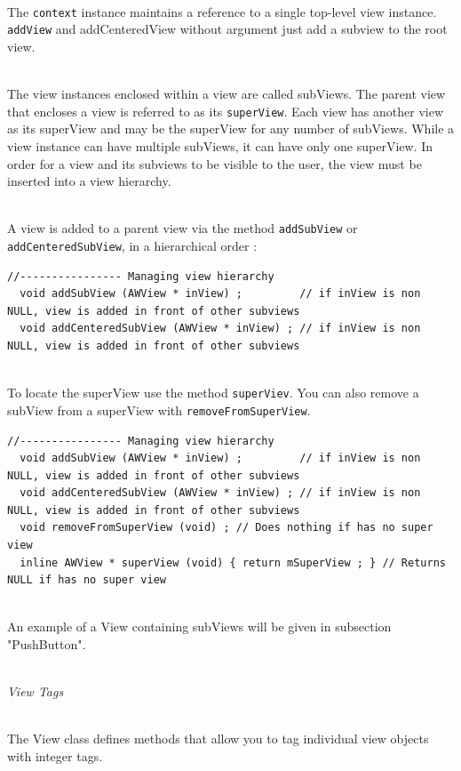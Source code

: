 \documentclass[a4paper,11pt]{extarticle}
\begin{document}
~\\The \texttt{context} instance maintains a reference to a single top-level view instance. \texttt{addView} and addCenteredView without argument just add a subview to the root view.

~\\The view instances enclosed within a view are called subViews. The parent view that encloses a view is referred to as its \texttt{superView}. Each view has another view as its superView and may be the superView for any number of subViews. While a view instance can have multiple subViews, it can have only one superView. In order for a view and its subviews to be visible to the user, the view must be inserted into a view hierarchy.

~\\ A view is added to a parent view via the method \texttt{addSubView} or \texttt{addCenteredSubView}, in a hierarchical order :
\begin{lstlisting}[language=Arduinonl]
//---------------- Managing view hierarchy
  void addSubView (AWView * inView) ;         // if inView is non NULL, view is added in front of other subviews
  void addCenteredSubView (AWView * inView) ; // if inView is non NULL, view is added in front of other subviews
\end{lstlisting}


~\\To locate the superView use the method \texttt{superViev}. You can also remove a subView from a superView with \texttt{removeFromSuperView}.

\begin{lstlisting}[language=Arduinonl]
//---------------- Managing view hierarchy
  void addSubView (AWView * inView) ;         // if inView is non NULL, view is added in front of other subviews
  void addCenteredSubView (AWView * inView) ; // if inView is non NULL, view is added in front of other subviews
  void removeFromSuperView (void) ; // Does nothing if has no super view
  inline AWView * superView (void) { return mSuperView ; } // Returns NULL if has no super view
\end{lstlisting}

~\\ An example of a View containing subViews will be given in subsection "PushButton".

~\\\emph{View Tags}

~\\The View class defines methods that allow you to tag individual view objects with integer tags.
\end{document}

